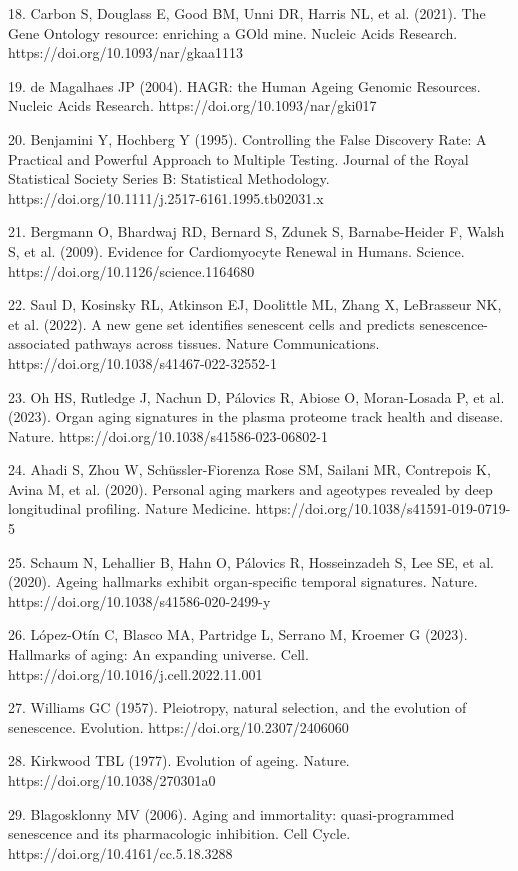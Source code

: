 \documentclass[11pt]{article}
\begin{document}
18. Carbon S, Douglass E, Good BM, Unni DR, Harris NL, et al. (2021). The Gene Ontology resource: enriching a GOld mine. Nucleic Acids Research. https://doi.org/10.1093/nar/gkaa1113

19. de Magalhaes JP (2004). HAGR: the Human Ageing Genomic Resources. Nucleic Acids Research. https://doi.org/10.1093/nar/gki017

20. Benjamini Y, Hochberg Y (1995). Controlling the False Discovery Rate: A Practical and Powerful Approach to Multiple Testing. Journal of the Royal Statistical Society Series B: Statistical Methodology. https://doi.org/10.1111/j.2517-6161.1995.tb02031.x

21. Bergmann O, Bhardwaj RD, Bernard S, Zdunek S, Barnabe-Heider F, Walsh S, et al. (2009). Evidence for Cardiomyocyte Renewal in Humans. Science. https://doi.org/10.1126/science.1164680

22. Saul D, Kosinsky RL, Atkinson EJ, Doolittle ML, Zhang X, LeBrasseur NK, et al. (2022). A new gene set identifies senescent cells and predicts senescence-associated pathways across tissues. Nature Communications. https://doi.org/10.1038/s41467-022-32552-1

23. Oh HS, Rutledge J, Nachun D, P\'alovics R, Abiose O, Moran-Losada P, et al. (2023). Organ aging signatures in the plasma proteome track health and disease. Nature. https://doi.org/10.1038/s41586-023-06802-1

24. Ahadi S, Zhou W, Sch\"ussler-Fiorenza Rose SM, Sailani MR, Contrepois K, Avina M, et al. (2020). Personal aging markers and ageotypes revealed by deep longitudinal profiling. Nature Medicine. https://doi.org/10.1038/s41591-019-0719-5

25. Schaum N, Lehallier B, Hahn O, P\'alovics R, Hosseinzadeh S, Lee SE, et al. (2020). Ageing hallmarks exhibit organ-specific temporal signatures. Nature. https://doi.org/10.1038/s41586-020-2499-y

26. L\'opez-Ot\'in C, Blasco MA, Partridge L, Serrano M, Kroemer G (2023). Hallmarks of aging: An expanding universe. Cell. https://doi.org/10.1016/j.cell.2022.11.001

27. Williams GC (1957). Pleiotropy, natural selection, and the evolution of senescence. Evolution. https://doi.org/10.2307/2406060

28. Kirkwood TBL (1977). Evolution of ageing. Nature. https://doi.org/10.1038/270301a0

29. Blagosklonny MV (2006). Aging and immortality: quasi-programmed senescence and its pharmacologic inhibition. Cell Cycle. https://doi.org/10.4161/cc.5.18.3288
\end{document}
